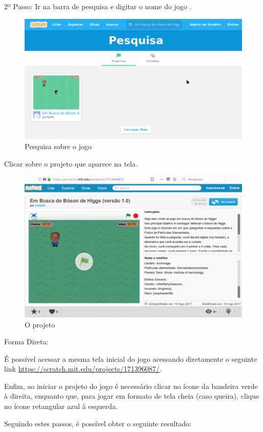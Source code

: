 \documentclass[12pt,fleqn]{book} %
\begin{document}
\newpage

2º Passo: Ir na barra de pesquisa e digitar o nome do jogo . 

\begin{figure}[h]
	\centering
	\includegraphics[width=0.7 \textwidth]{Produto/pesquisa}
	\caption{Pesquisa sobre o jogo}
	\label{fig:app_pesquisa}
\end{figure}

Clicar sobre o projeto que aparece na tela.

\begin{figure}[h]
	\centering
	\includegraphics[width=0.7 \textwidth]{Produto/site_jogo}
	\caption{O projeto}
	\label{fig:app_a:projeto}
\end{figure}

Forma Direta:

É possível acessar a mesma tela inicial do jogo acessando diretamente o seguinte link \url{https://scratch.mit.edu/projects/171396087/}.

Enfim, ao iniciar o projeto do jogo é necessário clicar no ícone da bandeira verde à direita, enquanto que, para jogar em formato de tela cheia (caso queira), clique no ícone retangular azul à esquerda.

\newpage

Seguindo estes passos, é possível obter o seguinte resultado:
\end{document}
